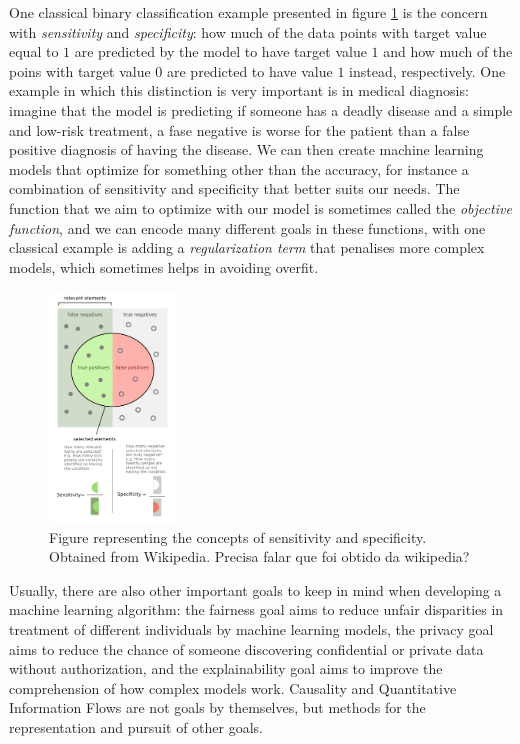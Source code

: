 One classical binary classification example presented in figure \ref{fig:TruePosWikipedia} is the concern with \emph{sensitivity} and \emph{specificity}: how much of the data points with target value equal to $1$ are predicted by the model to have target value $1$ and how much of the poins with target value $0$ are predicted to have value $1$ instead, respectively. One example in which this distinction is very important is in medical diagnosis: imagine that the model is predicting if someone has a deadly disease and a simple and low-risk treatment, a fase negative is worse for the patient than a false positive diagnosis of having the disease. We can then create machine learning models that optimize for something other than the accuracy, for instance a combination of sensitivity and specificity that better suits our needs. The function that we aim to optimize with our model is sometimes called the \emph{objective function}, and we can encode many different goals in these functions, with one classical example is adding a \emph{regularization term} that penalises more complex models, which sometimes helps in avoiding overfit.

\begin{figure}[ht]
\centering
\includegraphics[width=0.3\textwidth]{TruePosWikipedia}
\caption{Figure representing the concepts of sensitivity and specificity. Obtained from Wikipedia. {\color{orange} Precisa falar que foi obtido da wikipedia?}}\label{fig:TruePosWikipedia}
\end{figure}

Usually, there are also other important goals to keep in mind when developing a machine learning algorithm: the fairness goal aims to reduce unfair disparities in treatment of different individuals by machine learning models, the privacy goal aims to reduce the chance of someone discovering confidential or private data without authorization, and the explainability goal aims to improve the comprehension of how complex models work. Causality and Quantitative Information Flows are not goals by themselves, but methods for the representation and pursuit of other goals.

